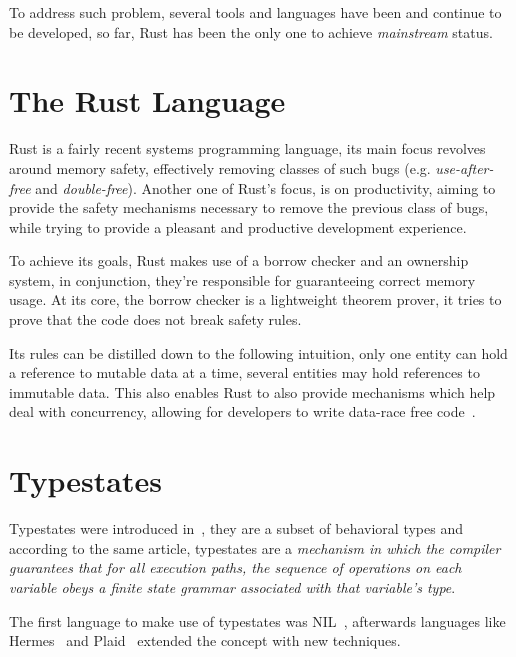 To address such problem, several tools and languages have been and continue to be developed,
so far, Rust has been the only one to achieve \emph{mainstream} status.

\section{The Rust Language}\label{sec:rust-lang}

Rust is a fairly recent systems programming language,
its main focus revolves around memory safety,
effectively removing classes of such bugs (e.g. \emph{use-after-free} and \emph{double-free}).
Another one of Rust's focus, is on productivity,
aiming to provide the safety mechanisms necessary to remove the previous class of bugs,
while trying to provide a pleasant and productive development experience.

To achieve its goals, Rust makes use of a borrow checker and an ownership system,
in conjunction, they're responsible for guaranteeing correct memory usage.
At its core, the borrow checker is a lightweight theorem prover,
it tries to prove that the code does not break safety rules.

Its rules can be distilled down to the following intuition,
only one entity can hold a reference to mutable data at a time,
several entities may hold references to immutable data.
This also enables Rust to also provide mechanisms which help deal with concurrency,
allowing for developers to write data-race free
code~\autocite{Turon2015}.

\section{Typestates}\label{sec:typestates}

Typestates were introduced in~\autocite{Strom1983},
they are a subset of behavioral types and
according to the same article, typestates are a
\emph{mechanism in which the compiler guarantees that for all execution paths,
the sequence of operations on each variable obeys a finite state grammar associated with that variable's type}.

The first language to make use of typestates was NIL~\autocite{Strom1983},
afterwards languages like Hermes~\autocite{Strom1990} and Plaid~\autocite{Aldrich2009}
extended the concept with new techniques.

